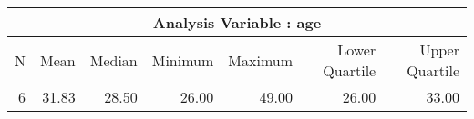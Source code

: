 \documentclass[10pt]{article}
\begin{document}
\begin{longtable}{|r|r|r|r|r|r|r|}\hline
   \multicolumn{7}{|c|}{Analysis Variable : age }\\\hline
   N &    Mean &    Median &    Minimum &    Maximum &    Lower Quartile &    Upper Quartile\\\hline
\endhead
   6 &    31.83 &    28.50 &    26.00 &    49.00 &    26.00 &    33.00\\\hline
\end{longtable}


\pagebreak


\pagebreak

\par 
\end{document}
